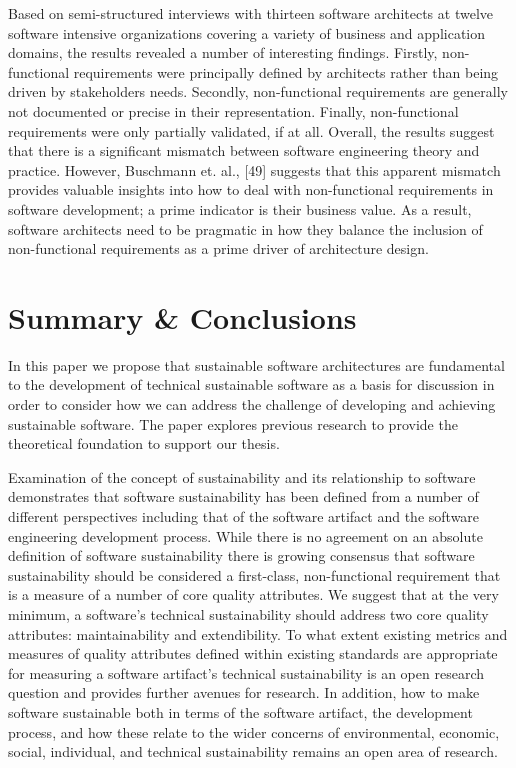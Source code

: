 \documentclass[preprint,12pt,authoryear]{elsarticle}
\begin{document}
Based on semi-structured interviews with thirteen software architects
at twelve software intensive organizations covering a variety of
business and application domains, the results revealed a number of
interesting findings. Firstly, non-functional requirements were
principally defined by architects rather than being driven by
stakeholders needs. Secondly, non-functional requirements are
generally not documented or precise in their representation. Finally,
non-functional requirements were only partially validated, if at
all. Overall, the results suggest that there is a significant mismatch
between software engineering theory and practice. However, Buschmann
et. al., [49] suggests that this apparent mismatch provides valuable
insights into how to deal with non-functional requirements in software
development; a prime indicator is their business value. As a result,
software architects need to be pragmatic in how they balance the
inclusion of non-functional requirements as a prime driver of
architecture design.


\section{Summary \& Conclusions}\label{summconc}

In this paper we propose that sustainable software architectures are
fundamental to the development of technical sustainable software as a
basis for discussion in order to consider how we can address the
challenge of developing and achieving sustainable software. The paper
explores previous research to provide the theoretical foundation to
support our thesis.

Examination of the concept of sustainability and its relationship to
software demonstrates that software sustainability has been defined
from a number of different perspectives including that of the software
artifact and the software engineering development process. While there
is no agreement on an absolute definition of software sustainability
there is growing consensus that software sustainability should be
considered a first-class, non-functional requirement that is a measure
of a number of core quality attributes. We suggest that at the very
minimum, a software's technical sustainability should address two core
quality attributes: maintainability and extendibility. To what extent
existing metrics and measures of quality attributes defined within
existing standards are appropriate for measuring a software artifact’s
technical sustainability is an open research question and provides
further avenues for research. In addition, how to make software
sustainable both in terms of the software artifact, the development
process, and how these relate to the wider concerns of environmental,
economic, social, individual, and technical sustainability remains an
open area of research.
\end{document}
